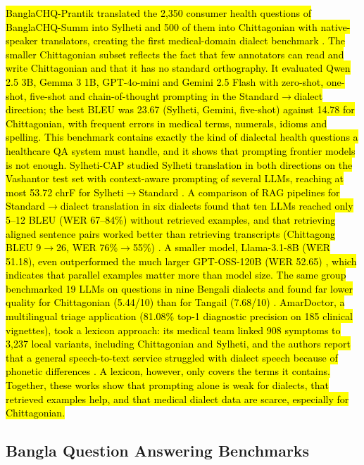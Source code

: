 \hl{BanglaCHQ-Prantik translated the 2,350 consumer health questions of
BanglaCHQ-Summ into Sylheti and 500 of them into Chittagonian with
native-speaker translators, creating the first medical-domain dialect
benchmark \cite{prantik2025}. The smaller Chittagonian subset reflects the fact
that few annotators can read and write Chittagonian and that it has no
standard orthography. It evaluated Qwen 2.5 3B, Gemma 3 1B, GPT-4o-mini
and Gemini 2.5 Flash with zero-shot, one-shot, five-shot and
chain-of-thought prompting in the Standard\ensuremath{\rightarrow}dialect direction; the best
BLEU was 23.67 (Sylheti, Gemini, five-shot) against 14.78 for
Chittagonian, with frequent errors in medical terms, numerals, idioms
and spelling. This benchmark contains exactly the kind of dialectal
health questions a healthcare QA system must handle, and it shows that
prompting frontier models is not enough. Sylheti-CAP studied Sylheti
translation in both directions on the Vashantor test set with
context-aware prompting of several LLMs, reaching at most 53.72 chrF for
Sylheti\ensuremath{\rightarrow}Standard \cite{prama2025sylheticap}. A comparison of RAG pipelines for
Standard\ensuremath{\rightarrow}dialect translation in six dialects found that ten LLMs reached
only 5--12 BLEU (WER 67--84\%) without retrieved examples, and that
retrieving aligned sentence pairs worked better than retrieving
transcripts (Chittagong BLEU 9\ensuremath{\rightarrow}26, WER 76\%\ensuremath{\rightarrow}55\%) \cite{sami2025comparative}. A smaller
model, Llama-3.1-8B (WER 51.18), even outperformed the much larger
GPT-OSS-120B (WER 52.65) \cite{sami2025comparative}, which indicates that parallel
examples matter more than model size. The same group benchmarked 19 LLMs
on questions in nine Bengali dialects and found far lower quality for
Chittagonian (5.44/10) than for Tangail (7.68/10) \cite{sami2026dialectbias}. AmarDoctor,
a multilingual triage application (81.08\% top-1 diagnostic precision on
185 clinical vignettes), took a lexicon approach: its medical team
linked 908 symptoms to 3,237 local variants, including Chittagonian and
Sylheti, and the authors report that a general speech-to-text service
struggled with dialect speech because of phonetic differences \cite{nahar2025amardoctor}. A
lexicon, however, only covers the terms it contains. Together, these
works show that prompting alone is weak for dialects, that retrieved
examples help, and that medical dialect data are scarce, especially for
Chittagonian.}

\subsection{Bangla Question Answering Benchmarks}\label{bangla-question-answering-benchmarks}

